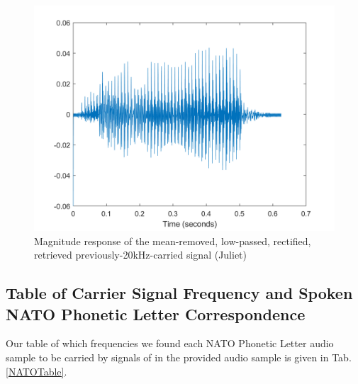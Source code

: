\documentclass[journal]{IEEEtran}
\begin{document}
\begin{figure}[!htb]
	\centering
  \includegraphics[width=\columnwidth]{JulietTime.png}
    \caption{Magnitude response of the mean-removed, low-passed, rectified, retrieved previously-20kHz-carried signal (Juliet)}   
    \label{JulietTime}
\end{figure}

\subsection{Table of Carrier Signal Frequency and Spoken NATO Phonetic Letter Correspondence}
Our table of which frequencies we found each NATO Phonetic Letter audio sample to be carried by signals of in the provided audio sample is given in Tab. \ref{NATOTable}.
\end{document}
